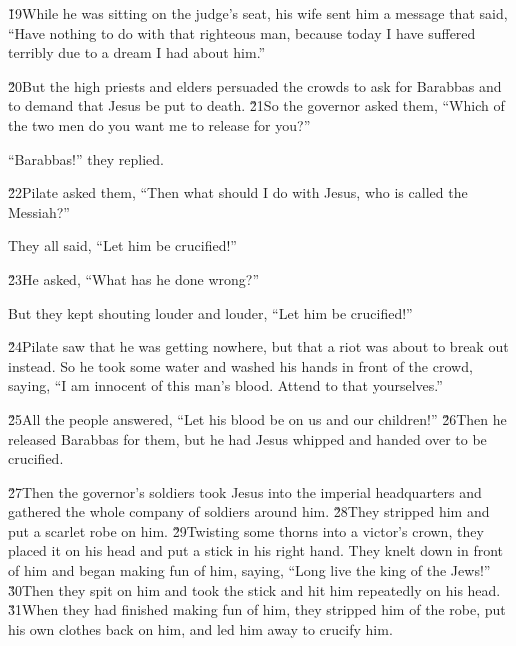 \v{19}While he was sitting on the judge's seat, his wife sent him a message that said, ``Have nothing to do with that righteous man, because today I have suffered terribly due to a dream I had about him.''

\v{20}But the high priests and elders persuaded the crowds to ask for Barabbas and to demand that Jesus be put to death. \v{21}So the governor asked them, ``Which of the two men do you want me to release for you?''

``Barabbas!'' they replied.

\v{22}Pilate asked them, ``Then what should I do with Jesus, who is called the Messiah?''

They all said, ``Let him be crucified!''

\v{23}He asked, ``What has he done wrong?''

But they kept shouting louder and louder, ``Let him be crucified!''

\v{24}Pilate saw that he was getting nowhere, but that a riot was about to break out instead. So he took some water and washed his hands in front of the crowd, saying, ``I am innocent of this man's blood. Attend to that yourselves.''

\v{25}All the people answered, ``Let his blood be on us and our children!'' \v{26}Then he released Barabbas for them, but he had Jesus whipped and handed over to be crucified.

\v{27}Then the governor's soldiers took Jesus into the imperial headquarters and gathered the whole company of soldiers around him. \v{28}They stripped him and put a scarlet robe on him. \v{29}Twisting some thorns into a victor's crown, they placed it on his head and put a stick in his right hand. They knelt down in front of him and began making fun of him, saying, ``Long live the king of the Jews!'' \v{30}Then they spit on him and took the stick and hit him repeatedly on his head. \v{31}When they had finished making fun of him, they stripped him of the robe, put his own clothes back on him, and led him away to crucify him.

